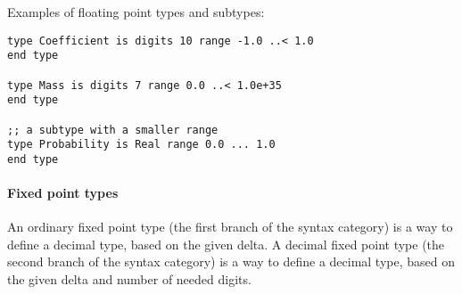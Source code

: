 \example Examples of floating point types and subtypes:
\begin{lstlisting}
type Coefficient is digits 10 range -1.0 ..< 1.0 
end type

type Mass is digits 7 range 0.0 ..< 1.0e+35 
end type

;; a subtype with a smaller range
type Probability is Real range 0.0 ... 1.0
end type
\end{lstlisting}

\paragraph{Fixed point types}
An ordinary fixed point type (the first branch of the  syntax category) is a way to define a decimal type, based on the given delta. 
A decimal fixed point type (the second branch of the  syntax category) is a way to define a decimal type, based on the given delta and number of needed digits.  
